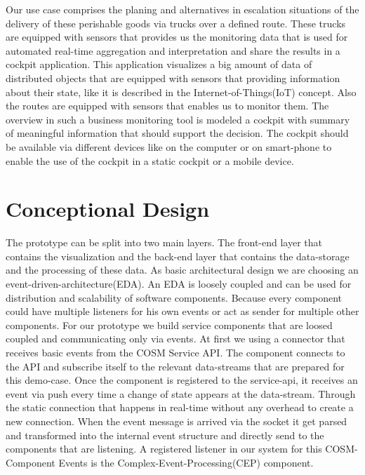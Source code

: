 \documentclass{acm_proc_article-sp}
\begin{document}
Our use case comprises the planing and alternatives in escalation situations of the delivery of these perishable goods via trucks over a defined route. These trucks are equipped with sensors that provides us the monitoring data that is used for automated real-time aggregation and interpretation and share the results in a cockpit application.
This application visualizes a big amount of data of distributed objects that are equipped with sensors that providing information about their state, like it is described in the Internet-of-Things(IoT) concept. 
Also the routes are equipped with sensors that enables us to monitor them.
The overview in such a business monitoring tool is modeled a cockpit with summary of meaningful information that should support the decision. 
The cockpit should be available via different devices like on the computer or on smart-phone to enable the use of the cockpit in a static cockpit or a mobile device.



\section{Conceptional Design}
\label{sec:Conceptional Design}
The prototype can be split into two main layers. The front-end layer that contains the visualization and the back-end layer that contains the data-storage and the processing of these data.
As basic architectural design we are choosing an event-driven-architecture(EDA).
An EDA is loosely coupled and can be used for distribution and scalability of software components. Because every component could have multiple listeners for his own events or act as sender for multiple other components.
For our prototype we build service components that are loosed coupled and communicating only via events.
At first we using a connector that receives basic events from the COSM Service API.
The component connects to the API and subscribe itself to the relevant data-streams that are prepared for this demo-case.
Once the component is registered to the service-api, it receives an event via push every time a change of state appears at the data-stream. Through the static connection that happens in real-time without any overhead to create a new connection.
When the event message is arrived via the socket it get parsed and transformed into the internal event structure and directly send to the components that are listening.
A registered listener in our system for this COSM-Component Events is the Complex-Event-Processing(CEP) component.
\end{document}

